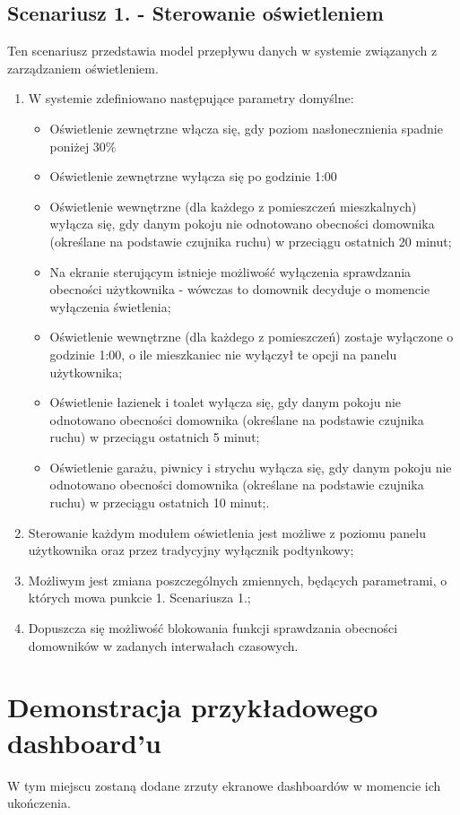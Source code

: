 \documentclass[12pt]{article} %
\begin{document}
\subsection{Scenariusz 1. - Sterowanie oświetleniem}
Ten scenariusz przedstawia model przepływu danych w systemie związanych z zarządzaniem oświetleniem.
\begin{enumerate}
\item 
W systemie zdefiniowano następujące parametry domyślne:
	\begin{itemize}
	\item 
	Oświetlenie zewnętrzne włącza się, gdy poziom 	nasłonecznienia spadnie poniżej 30\%
	\item 
	Oświetlenie zewnętrzne wyłącza się po godzinie 1:00
	\item 
	Oświetlenie wewnętrzne (dla każdego z pomieszczeń mieszkalnych) wyłącza się, gdy danym pokoju nie odnotowano obecności domownika (określane na podstawie czujnika ruchu) w przeciągu ostatnich 20 minut;
	\item
	Na ekranie sterującym istnieje możliwość wyłączenia sprawdzania obecności użytkownika - wówczas to domownik decyduje o momencie wyłączenia świetlenia;
	\item 
	Oświetlenie wewnętrzne (dla każdego z pomieszczeń) zostaje wyłączone o godzinie 1:00, o ile mieszkaniec nie wyłączył te opcji na panelu użytkownika;
	\item 
		Oświetlenie łazienek i toalet wyłącza się, gdy danym pokoju nie odnotowano obecności domownika (określane na podstawie czujnika ruchu) w przeciągu ostatnich 5 minut;
	\item 
	Oświetlenie garażu, piwnicy i strychu wyłącza się, gdy danym pokoju nie odnotowano obecności domownika (określane na podstawie czujnika ruchu) w przeciągu ostatnich 10 minut;.
	\end{itemize}

\item
Sterowanie każdym modułem oświetlenia jest możliwe z poziomu panelu użytkownika oraz przez tradycyjny wyłącznik podtynkowy;
\item 
Możliwym jest zmiana poszczególnych zmiennych, będących parametrami, o których mowa punkcie 1. Scenariusza 1.;
\item 
Dopuszcza się możliwość blokowania funkcji sprawdzania obecności domowników w zadanych interwałach czasowych.

\end{enumerate}

\newpage
\section{Demonstracja przykładowego dashboard'u}
W tym miejscu zostaną dodane zrzuty ekranowe dashboardów w momencie ich ukończenia.
\end{document}
